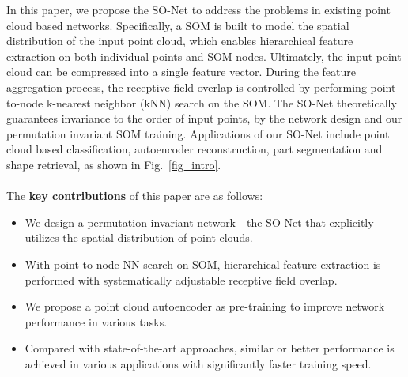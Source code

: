 \documentclass[10pt,twocolumn,letterpaper]{article}
\begin{document}
In this paper, we propose the SO-Net to address the problems in existing point cloud based networks. Specifically, a SOM \cite{kohonen1998self} is built to model the spatial distribution of the input point cloud, which enables hierarchical feature extraction on both individual points and SOM nodes. Ultimately, the input point cloud can be compressed into a single feature vector. During the feature aggregation process, the receptive field overlap is controlled by performing point-to-node k-nearest neighbor (kNN) search on the SOM. The SO-Net theoretically guarantees invariance to the order of input points, by the network design and our permutation invariant SOM training. Applications of our SO-Net include point cloud based classification, autoencoder reconstruction, part segmentation and shape retrieval, as shown in Fig.~\ref{fig_intro}.
\\\\
\noindent The \textbf{key contributions} of this paper are as follows:
\begin{itemize}
    \item We design a permutation invariant network - the SO-Net that explicitly utilizes the spatial distribution of point clouds. 
    \item With point-to-node NN search on SOM, hierarchical feature extraction is performed with systematically adjustable receptive field overlap.
    \item We propose a point cloud autoencoder as pre-training to improve network performance in various tasks.
    \item Compared with state-of-the-art approaches, similar or better performance is achieved in various applications with significantly faster training speed.
\end{itemize}
\end{document}
